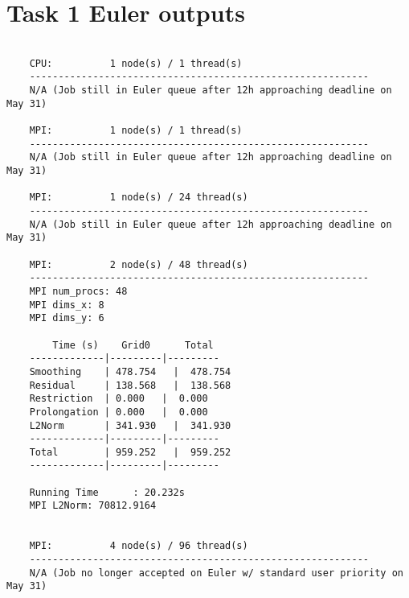 \documentclass[11pt,a4paper]{article}
\begin{document}
\section{Task 1 Euler outputs}
\begin{lstlisting}[basicstyle=\tiny,
				   frame=single,
				   breaklines=true,
  	               postbreak=\mbox{\textcolor{red}{$\hookrightarrow$}\space},
				   caption={Task 2: Collected Euler outputs.}, label={lst:1}]
	
	CPU:          1 node(s) / 1 thread(s)
	-----------------------------------------------------------
	N/A (Job still in Euler queue after 12h approaching deadline on May 31)
	
	MPI:          1 node(s) / 1 thread(s)
	-----------------------------------------------------------
	N/A (Job still in Euler queue after 12h approaching deadline on May 31)
	
	MPI:          1 node(s) / 24 thread(s)
	-----------------------------------------------------------
	N/A (Job still in Euler queue after 12h approaching deadline on May 31)
	
	MPI:          2 node(s) / 48 thread(s)
	-----------------------------------------------------------
	MPI num_procs: 48
	MPI dims_x: 8
	MPI dims_y: 6
	
		Time (s)    Grid0      Total  
	-------------|---------|---------
	Smoothing    | 478.754   |  478.754  
	Residual     | 138.568   |  138.568  
	Restriction  | 0.000   |  0.000  
	Prolongation | 0.000   |  0.000  
	L2Norm       | 341.930   |  341.930  
	-------------|---------|---------
	Total        | 959.252   |  959.252  
	-------------|---------|---------
	
	Running Time      : 20.232s
	MPI L2Norm: 70812.9164
	
	
	MPI:          4 node(s) / 96 thread(s)
	-----------------------------------------------------------
	N/A	(Job no longer accepted on Euler w/ standard user priority on May 31)
	

	\end{lstlisting}
\end{document}
